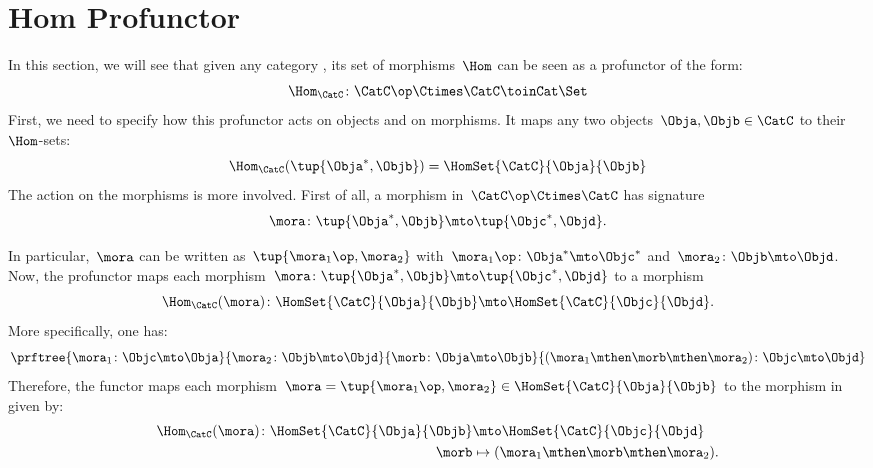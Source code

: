 

\section{Hom Profunctor}


In this section, we will see that given any category \CatC, its set of morphisms~$\Hom$ can be seen as a profunctor of the form:
\begin{equation}
    \label{eq:hom-signature}
    \Hom_\CatC\colon \CatC \op \Ctimes \CatC \toinCat \Set
\end{equation}
First, we need to specify how this profunctor acts on objects and on morphisms.
It maps any two objects~$\Obja,\Objb\in \CatC$ to their~$\Hom$-sets:
\begin{equation}
    \label{eq:hom-action}
    \Hom_\CatC(\tup{\Obja^*,\Objb})=\HomSet{\CatC}{\Obja}{\Objb}
\end{equation}
The action on the morphisms is more involved. First of all, a morphism in~$\CatC\op \Ctimes \CatC$ has signature~
\begin{equation}
    \label{eq:hom0}
    \mora \colon \tup{\Obja^*,\Objb}\mto \tup{\Objc^*, \Objd}.
\end{equation}

In particular,~$\mora$ can be written as~$\tup{\mora_1\op,\mora_2}$ with~$\mora_1\op\colon \Obja^*\mto \Objc^*$ and~$\mora_2\colon \Objb\mto \Objd$.
Now, the profunctor maps each morphism~$\mora \colon \tup{\Obja^*,\Objb}\mto \tup{\Objc^*, \Objd}$ to a morphism
\begin{equation}
    \label{eq:hom2}
    \Hom_\CatC(\mora)\colon \HomSet{\CatC}{\Obja}{\Objb}\mto \HomSet{\CatC}{\Objc}{\Objd}.
\end{equation}
More specifically, one has:
\begin{equation}
    \label{eq:hom3}
    \prftree{\mora_1\colon \Objc \mto \Obja}{\mora_2\colon \Objb\mto \Objd}{\morb\colon \Obja\mto \Objb}{(\mora_1\mthen \morb \mthen \mora_2)\colon \Objc\mto \Objd}
\end{equation}
Therefore, the functor maps each morphism~$\mora=\tup{\mora_1\op,\mora_2}\in \HomSet{\CatC}{\Obja}{\Objb}$ to the morphism in \Set given by:
\begin{equation}
    \label{eq:hom4}
    \begin{aligned}
        \Hom_\CatC(\mora)\colon \HomSet{\CatC}{\Obja}{\Objb}&\mto \HomSet{\CatC}{\Objc}{\Objd}\\
        \morb &\mapsto (\mora_1\mthen \morb \mthen \mora_2).
    \end{aligned}
\end{equation}

